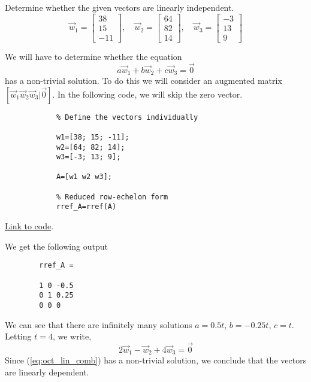 \documentclass{ximera}
\begin{document}
\begin{example}\label{ex_oct_lin_ind}
    Determine whether the given vectors are linearly independent.  
    $$\vec{w}_1=\begin{bmatrix}38\\15\\-11\end{bmatrix},\quad \vec{w}_2=\begin{bmatrix}64\\82\\14\end{bmatrix},\quad \vec{w}_3=\begin{bmatrix}-3\\13\\9\end{bmatrix}$$

    \begin{explanation}
        We will have to determine whether the equation
        \begin{equation}\label{eq:oct_lin_comb}
            a\vec{w}_1+b\vec{w}_2+c\vec{w}_3=\vec{0}\end{equation}
        has a non-trivial solution.  To do this we will consider an augmented matrix $[\vec{w}_1 \vec{w}_2 \vec{w}_3 | \vec{0}]$.  In the following code, we will skip the zero vector.

        \begin{verbatim}
            % Define the vectors individually

            w1=[38; 15; -11];
            w2=[64; 82; 14];
            w3=[-3; 13; 9];

            A=[w1 w2 w3];

            % Reduced row-echelon form
            rref_A=rref(A)
        \end{verbatim}

        \href{https://sagecell.sagemath.org/?z=eJwlyMEKAiEUheG94DvczUAtXKhTTIgLoSdoKxGhV0YwBZsZ6e1zanH4Od8AVwwxIywzwoZuKfUNMfu4Rb8-U_pQQknj2spJAT8pYJzfVSeh7XlUMInO40-ktkz213fZgRKjbePQBDT5B0oGuKFfHXqopTF0M6aSIZT6oqRWDA-j9xzM8QvYDCpA&lang=octave&interacts=eJyLjgUAARUAuQ==}{Link to code}.
   
    We get the following output

    \begin{verbatim}
        rref_A =

        1 0 -0.5
        0 1 0.25
        0 0 0
    \end{verbatim}
We can see that there are infinitely many solutions $a=0.5t$, $b=-0.25t$, $c=t$.  Letting $t=4$, we write,
$$2\vec{w}_1-\vec{w}_2+4\vec{w}_3=\vec{0}$$
Since (\ref{eq:oct_lin_comb}) has a non-trivial solution, we conclude that the vectors are linearly dependent.
\end{explanation}
\end{example}
\end{document}
